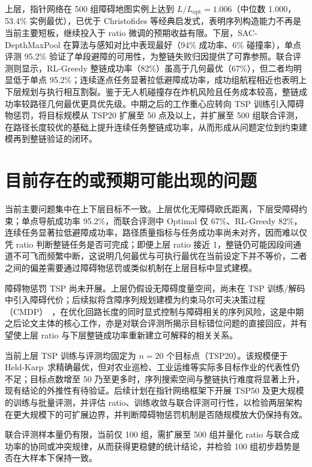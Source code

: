上层，指针网络在 500 组障碍地图实例上达到 $L/L_{\mathrm{opt}}=1.006$（中位数 1.000，53.4\% 实例最优），已优于 Christofides 等经典启发式，表明序列构造能力不再是当前主要短板，继续投入于 ratio 微调的预期收益有限。下层，SAC-DepthMaxPool 在算法与感知对比中表现最好（94\% 成功率、6\% 碰撞率），单点评测 95.2\% 验证了单段避障的可用性，为整链失败归因提供了可靠参照。联合评测则显示，RL-Greedy 整链成功率（82\%）虽高于几何最优（67\%），但二者均明显低于单点 95.2\%；连续逐点任务显著拉低避障成功率，成功组航程相近也表明上下层规划与执行相互割裂。鉴于无人机碰撞存在炸机风险且任务成本较高，整链成功率较路径几何最优更具优先级。中期之后的工作重心应转向 TSP 训练引入障碍物惩罚，将目标规模从 TSP20 扩展至 50 点及以上，并扩展至 500 组联合评测，在路径长度较优的基础上提升连续任务整链成功率，从而形成从问题定位到约束建模再到整链验证的闭环。

\section{目前存在的或预期可能出现的问题}

当前主要问题集中在上下层目标不一致。上层优化无障碍欧氏距离，下层受障碍约束；单点导航成功率 95.2\%，而联合评测中 Optimal 仅 67\%、RL-Greedy 82\%，连续任务显著拉低避障成功率，路径质量指标与任务成功率尚未对齐，因而难以仅凭 ratio 判断整链任务是否可完成；即便上层 ratio 接近 1，整链仍可能因段间通道不可飞而频繁中断，这说明几何最优与可执行最优在当前设定下并不等价，二者之间的偏差需要通过障碍物惩罚或类似机制在上层目标中显式建模。

障碍物惩罚 TSP 尚未开展。上层仍假设无障碍度量空间，尚未在 TSP 训练/解码中引入障碍代价；后续拟将含障序列规划建模为约束马尔可夫决策过程（CMDP）~\cite{altman2021cmdp}，在优化回路长度的同时显式控制与障碍相关的序列风险，这是中期之后论文主体的核心工作，亦是对联合评测所揭示目标错位问题的直接回应，并有望使上层 ratio 与下层整链成功率重新建立可解释的相关关系。

当前上层 TSP 训练与评测均固定为 $n=20$ 个目标点（TSP20）。该规模便于 Held-Karp~\cite{lin1973karp}求精确最优，但对农业巡检、工业运维等实际多目标作业的代表性仍不足；目标点数增至 50 乃至更多时，序列搜索空间与整链执行难度将显著上升，现有结论的外推性有待验证。后续计划在指针网络框架下开展 TSP50 及更大规模的训练与批量评测，并评估 ratio、训练收敛与联合评测可行性，以检验两层架构在更大规模下的可扩展边界，并判断障碍物惩罚机制是否随规模放大仍保持有效。

联合评测样本量仍有限，当前仅 100 组，需扩展至 500 组并量化 ratio 与联合成功率的协同或冲突规律，从而获得更稳健的统计结论，并检验 100 组初步趋势是否在大样本下保持一致。

